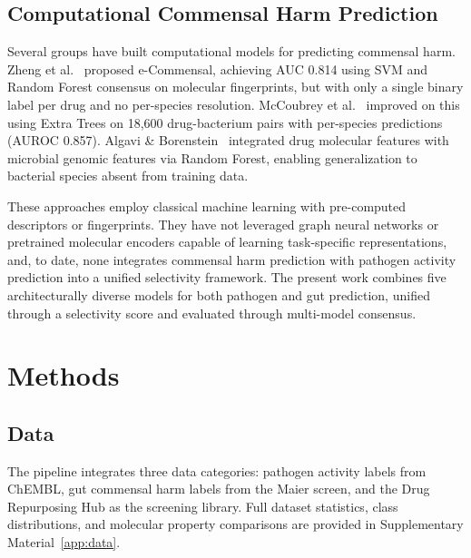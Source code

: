 \documentclass{article}
\begin{document}
\subsection{Computational Commensal Harm Prediction}

Several groups have built computational models for predicting commensal harm.
Zheng et al.~\citep{zheng2019} proposed e-Commensal, achieving AUC 0.814 using SVM and Random Forest consensus on molecular fingerprints, but with only a single binary label per drug and no per-species resolution.
McCoubrey et al.~\citep{mccoubrey2021} improved on this using Extra Trees on 18,600 drug-bacterium pairs with per-species predictions (AUROC 0.857).
Algavi \& Borenstein~\citep{algavi2023} integrated drug molecular features with microbial genomic features via Random Forest, enabling generalization to bacterial species absent from training data.

These approaches employ classical machine learning with pre-computed descriptors or fingerprints. They have not leveraged graph neural networks or pretrained molecular encoders capable of learning task-specific representations, and, to date, none integrates commensal harm prediction with pathogen activity prediction into a unified selectivity framework.
The present work combines five architecturally diverse models for both pathogen and gut prediction, unified through a selectivity score and evaluated through multi-model consensus.


\section{Methods}
\label{sec:methods}

\subsection{Data}
\label{sec:data}

The pipeline integrates three data categories: pathogen activity labels from ChEMBL, gut commensal harm labels from the Maier screen, and the Drug Repurposing Hub as the screening library. Full dataset statistics, class distributions, and molecular property comparisons are provided in Supplementary Material~\ref{app:data}.
\end{document}
